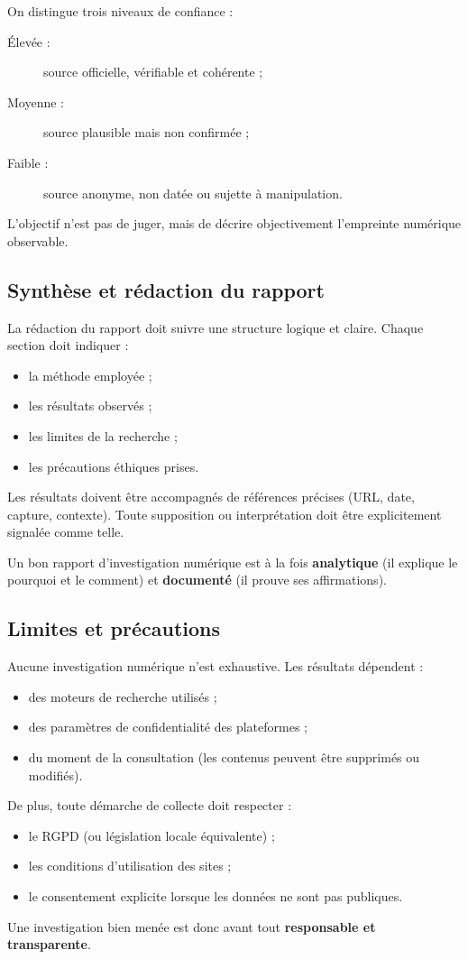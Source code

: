 \documentclass[12pt,a4paper]{report}
\begin{document}
	On distingue trois niveaux de confiance :
	\begin{description}
		\item[Élevée :] source officielle, vérifiable et cohérente ;
		\item[Moyenne :] source plausible mais non confirmée ;
		\item[Faible :] source anonyme, non datée ou sujette à manipulation.
	\end{description}
	L’objectif n’est pas de juger, mais de décrire objectivement l’empreinte numérique observable.
	
	\subsection{Synthèse et rédaction du rapport}
	La rédaction du rapport doit suivre une structure logique et claire. Chaque section doit indiquer :
	\begin{itemize}
		\item la méthode employée ;
		\item les résultats observés ;
		\item les limites de la recherche ;
		\item les précautions éthiques prises.
	\end{itemize}
	Les résultats doivent être accompagnés de références précises (URL, date, capture, contexte).  
	Toute supposition ou interprétation doit être explicitement signalée comme telle.  
	
	Un bon rapport d’investigation numérique est à la fois \textbf{analytique} (il explique le pourquoi et le comment) et \textbf{documenté} (il prouve ses affirmations).
	
	\subsection{Limites et précautions}
	Aucune investigation numérique n’est exhaustive. Les résultats dépendent :
	\begin{itemize}
		\item des moteurs de recherche utilisés ;
		\item des paramètres de confidentialité des plateformes ;
		\item du moment de la consultation (les contenus peuvent être supprimés ou modifiés).
	\end{itemize}
	De plus, toute démarche de collecte doit respecter :
	\begin{itemize}
		\item le RGPD (ou législation locale équivalente) ;
		\item les conditions d’utilisation des sites ;
		\item le consentement explicite lorsque les données ne sont pas publiques.
	\end{itemize}
	Une investigation bien menée est donc avant tout \textbf{responsable et transparente}.
	
\end{document}
